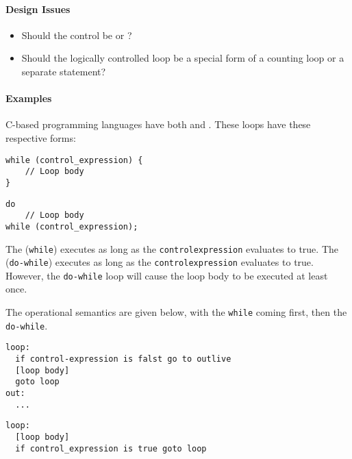 \paragraph{Design Issues}\label{par:Logically_Controlled_Loops-Design_Issues}
\begin{itemize}[noitemsep]
\item Should the control be  or ?
\item Should the logically controlled loop be a special form of a counting loop or a separate statement?
\end{itemize}

\paragraph{Examples}\label{par:Logically_Controlled_Loops-Examples}
C-based programming languages have both  and  .
These loops have these respective forms:
\begin{verbatim}
while (control_expression) {
    // Loop body
}
\end{verbatim}
\begin{verbatim}
do
    // Loop body
while (control_expression);
\end{verbatim}

The  (\texttt{while}) executes as long as the \texttt{control\textunderscore{}expression} evaluates to true.
The  (\texttt{do-while}) executes as long as the \texttt{control\textunderscore{}expression} evaluates to true.
However, the \texttt{do-while} loop will cause the loop body to be executed at least once.

The operational semantics are given below, with the \texttt{while} coming first, then the \texttt{do-while}.
\begin{verbatim}
loop:
  if control-expression is falst go to outlive
  [loop body]
  goto loop
out:
  ...
\end{verbatim}

\begin{verbatim}
loop:
  [loop body]
  if control_expression is true goto loop
\end{verbatim}

